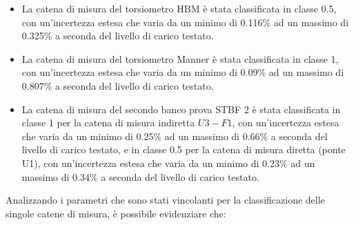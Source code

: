 \documentclass[a4paper, twoside]{article}
\begin{document}
\begin{itemize}
    
    \item La catena di misura del torsiometro HBM è stata classificata in classe 0.5, con un'incertezza estesa che varia da un minimo di 0.116\% ad un massimo di 0.325\% a seconda del livello di carico testato. 
   
    \item La catena di misura del torsiometro Manner è stata classificata in classe 1, con un'incertezza estesa che varia da un minimo di 0.09\% ad un massimo di 0.807\% a seconda del livello di carico testato.
    
    \item La catena di misura del secondo banco prova STBF 2 è stata classificata in classe 1 per la catena di misura indiretta $U3-F1$, con un'incertezza estesa che varia da un minimo di 0.25\% ad un massimo di 0.66\% a seconda del livello di carico testato, e in classe 0.5 per la catena di misura diretta (ponte U1), con un'incertezza estesa che varia da un minimo di 0.23\% ad un massimo di 0.34\% a seconda del livello di carico testato.

\end{itemize}


    Analizzando i parametri che sono stati vincolanti per la classificazione delle singole catene di misura, è possibile evidenziare che:
\end{document}
